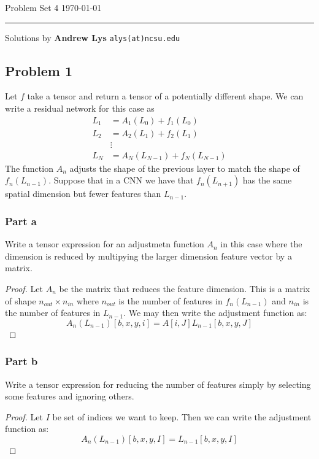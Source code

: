 \documentclass{amsart}
\theoremstyle{definition}
\begin{document}
\noindent
Problem Set 4  \hfill \today  %
\smallskip
\hrule
\smallskip
\noindent
Solutions by {\bf Andrew Lys} \qquad   %
  {\tt alys(at)ncsu.edu}

\vspace{0.5cm}
\subsection*{Problem 1}
Let $f$ take a tensor and return a tensor of a potentially different shape. 
We can write a residual network for this case as 
\begin{align*}
  L_1 &= A_1(L_0) + f_1(L_0) \\
  L_2 &= A_2(L_1) + f_2(L_1) \\
  &\vdots \\
  L_N &= A_N(L_{N-1}) + f_N(L_{N-1})
\end{align*}
The function $A_n$ adjusts the shape of the previous layer to match the shape of $f_n(L_{n-1})$.
Suppose that in a CNN we have that $f_n(L_{n+1})$ has the same spatial dimension but fewer features than $L_{n - 1}$.
\subsubsection*{Part a} Write a tensor expression for an adjustmetn function $A_n$ in this case where the dimension is reduced by multipying the larger dimension feature vector by a matrix. 
\begin{proof}
  Let $A_n$ be the matrix that reduces the feature dimension. 
  This is a matrix of shape $n_{out} \times n_{in}$ where $n_{out}$ is the number of features in $f_n(L_{n-1})$ and $n_{in}$ is the number of features in $L_{n-1}$.
  We may then write the adjustment function as:
  \[
  A_n(L_{n - 1})[b, x, y, i] = A[i, J] L_{n - 1}[b, x, y, J]
  \]
\end{proof}

\subsubsection*{Part b}
Write a tensor expression for reducing the number of features simply by selecting some features and ignoring others. 
\begin{proof}
  Let $I$ be set of indices we want to keep. Then we can write the adjustment function as:
  \[
  A_n(L_{n - 1}) [b, x, y, I] = L_{n-1}[b, x, y, I]
  \]
\end{proof}
\end{document}

